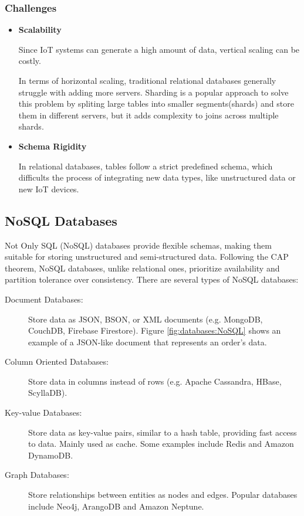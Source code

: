 \subsubsection{Challenges}
\begin{itemize}

	\item \textbf{Scalability}

	      Since IoT systems can generate a high amount of data, vertical scaling can
	      be costly.

	      In terms of horizontal scaling, traditional relational databases generally
	      struggle with adding more servers. Sharding is a popular approach to
	      solve this problem by spliting large tables into smaller segments(shards)
	      and store them in different servers, but it adds complexity to joins
	      across multiple shards.

	\item \textbf{Schema Rigidity}

	      In relational databases, tables follow a strict predefined schema, which
	      difficults the process of integrating new data types, like unstructured
	      data or new IoT devices.

\end{itemize}


\subsection{NoSQL Databases}
Not Only SQL (NoSQL) databases provide flexible schemas, making them suitable
for storing unstructured and semi-structured data. Following the CAP theorem,
NoSQL databases, unlike relational ones, prioritize availability and partition
tolerance over consistency. There are several types of NoSQL databases:

\begin{description}

	\item[Document Databases: ]Store data as JSON, BSON, or XML documents (e.g.
	      MongoDB, CouchDB, Firebase Firestore). Figure \ref{fig:databases:NoSQL}
	      shows an example of a JSON-like document that represents an order's data.
	\item[Column Oriented Databases: ]Store data in columns instead of rows (e.g.
	      Apache Cassandra, HBase, ScyllaDB).
	\item[Key-value Databases: ]Store data as key-value pairs, similar to
	      a hash table, providing fast access to data. Mainly used as cache. Some
	      examples include Redis and Amazon DynamoDB.
	\item[Graph Databases: ]Store relationships between entities as nodes and
	      edges. Popular databases include Neo4j, ArangoDB and Amazon Neptune.

\end{description}


